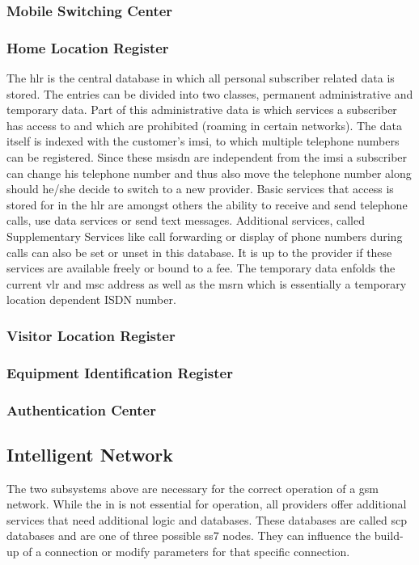 \subsubsection{Mobile Switching Center}
\subsubsection{Home Location Register}
The \gls{hlr} is the central database in which all personal subscriber related data is stored.
The entries can be divided into two classes, permanent administrative and temporary data.
Part of this administrative data is which services a subscriber has access to and which are prohibited (\eg roaming in certain networks).
The data itself is indexed with the customer's \gls{imsi}, to which multiple telephone numbers can be registered.
Since these \gls{msisdn} are independent from the \gls{imsi} a subscriber can change his telephone number and thus also move the telephone number along should he/she decide to switch to a new provider.
Basic services that access is stored for in the \gls{hlr} are amongst others the ability to receive and send telephone calls, use data services or send text messages.
Additional services, called Supplementary Services like call forwarding or display of phone numbers during calls can also be set or unset in this database.
It is up to the provider if these services are available freely or bound to a fee.
The temporary data enfolds the current \gls{vlr} and \gls{msc} address as well as the \gls{msrn} which is essentially a temporary location dependent ISDN number.

 
\subsubsection{Visitor Location Register}
\subsubsection{Equipment Identification Register}
\subsubsection{Authentication Center}

\subsection{Intelligent Network}
The two subsystems above are necessary for the correct operation of a \gls{gsm} network.
While the \gls{in} is not essential for operation, all providers offer additional services that need additional logic and databases.
These databases are called \gls{scp} databases and are one of three possible \gls{ss7} nodes.
They can influence the build-up of a connection or modify parameters for that specific connection.

